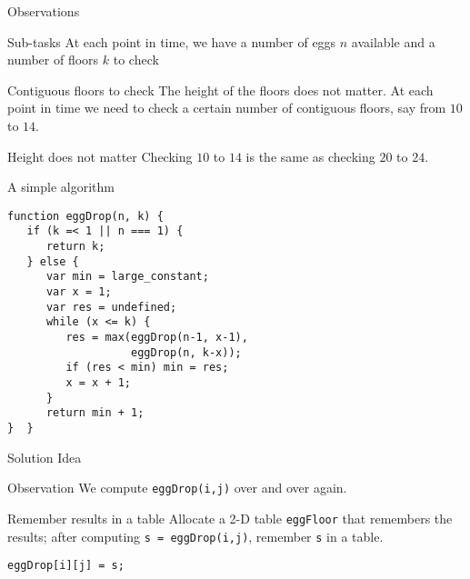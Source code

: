    \begin{frame}[fragile]{Observations}

\begin{block}{Sub-tasks}
At each point in time, we have a number of eggs $n$ available 
and a number of floors $k$ to check
\end{block}


\begin{block}{Contiguous floors to check}
The height of the floors does not matter. At each point in time
we need to check a certain number of contiguous floors, say from
$10$ to $14$.
\end{block}

\begin{block}{Height does not matter}
Checking $10$ to $14$ is the same as checking 
$20$ to $24$.
\end{block}

\end{frame}

   \begin{frame}[fragile]{A simple algorithm}

\begin{lstlisting}
function eggDrop(n, k) {
   if (k =< 1 || n === 1) {
      return k;
   } else {
      var min = large_constant;
      var x = 1;
      var res = undefined;
      while (x <= k) {
         res = max(eggDrop(n-1, x-1),
                   eggDrop(n, k-x));
         if (res < min) min = res;
         x = x + 1;
      }
      return min + 1;
}  }
\end{lstlisting}
\end{frame}

   \begin{frame}[fragile]{Solution Idea}

\begin{block}{Observation}
We compute \lstinline{eggDrop(i,j)} over and over again.
\end{block}


\begin{block}{Remember results in a table}
Allocate a 2-D table \lstinline{eggFloor} that remembers
the results; after computing \lstinline{s = eggDrop(i,j)},
remember \lstinline{s} in a table.
\end{block}

\begin{lstlisting}
eggDrop[i][j] = s;
\end{lstlisting}

\end{frame}

